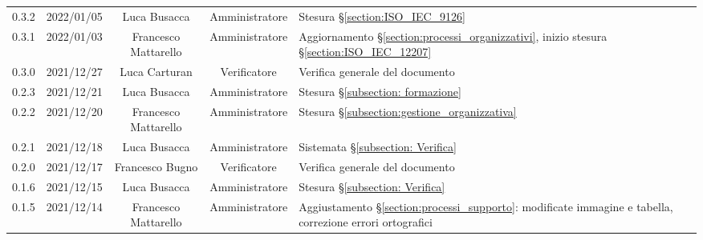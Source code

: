 \begin{center}
\begin{longtable}[c]{c | c | c | c | p{5cm}}
		0.3.2                                                      & 2022/01/05 & Luca Busacca         & Amministratore & Stesura §\ref{section:ISO_IEC_9126}                                                                                                       \\
		0.3.1                                                      & 2022/01/03 & Francesco Mattarello & Amministratore & Aggiornamento §\ref{section:processi_organizzativi}, inizio stesura §\ref{section:ISO_IEC_12207}                                          \\
		0.3.0                                                      & 2021/12/27 & Luca Carturan        & Verificatore   & Verifica generale del documento                                                                                                           \\
		0.2.3                                                      & 2021/12/21 & Luca Busacca         & Amministratore & Stesura §\ref{subsection: formazione}                                                                                                     \\
		0.2.2                                                      & 2021/12/20 & Francesco Mattarello & Amministratore & Stesura §\ref{subsection:gestione_organizzativa}                                                                                          \\
		0.2.1                                                      & 2021/12/18 & Luca Busacca         & Amministratore & Sistemata §\ref{subsection: Verifica}                                                                                                     \\
		0.2.0                                                      & 2021/12/17 & Francesco Bugno      & Verificatore   & Verifica generale del documento                                                                                                           \\
		0.1.6                                                      & 2021/12/15 & Luca Busacca         & Amministratore & Stesura §\ref{subsection: Verifica}                                                                                                       \\
		0.1.5                                                      & 2021/12/14 & Francesco Mattarello & Amministratore & Aggiustamento §\ref{section:processi_supporto}: modificate immagine e tabella, correzione errori ortografici                              \\

\end{longtable}
\end{center}
